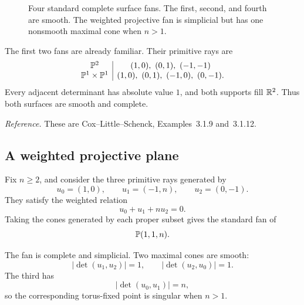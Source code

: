 \begin{figure}[ht]
\caption{Four standard complete surface fans. The first, second, and
fourth are smooth. The weighted projective fan is simplicial but has
one nonsmooth maximal cone when \(n>1\).}
\label{fig:four-standard-surface-fans}
\end{figure}

The first two fans are already familiar. Their primitive rays are
\[
\begin{array}{c|c}
\mathbb{P}^2
&
(1,0),\ (0,1),\ (-1,-1)
\\
\mathbb{P}^1\times\mathbb{P}^1
&
(1,0),\ (0,1),\ (-1,0),\ (0,-1).
\end{array}
\]
Every adjacent determinant has absolute value \(1\), and both supports
fill \(\mathbb{R}^2\). Thus both surfaces are smooth and complete.

\noindent
\textit{Reference.}
These are Cox--Little--Schenck, Examples~3.1.9 and~3.1.12.

\subsection{A weighted projective plane}

Fix \(n\geq2\), and consider the three primitive rays generated by
\[
u_0=(1,0),
\qquad
u_1=(-1,n),
\qquad
u_2=(0,-1).
\]
They satisfy the weighted relation
\[
u_0+u_1+n u_2=0.
\]
Taking the cones generated by each proper subset gives the standard
fan of
\[
\mathbb{P}(1,1,n).
\]

The fan is complete and simplicial. Two maximal cones are smooth:
\[
|\det(u_1,u_2)|=1,
\qquad
|\det(u_2,u_0)|=1.
\]
The third has
\[
|\det(u_0,u_1)|=n,
\]
so the corresponding torus-fixed point is singular when \(n>1\).

